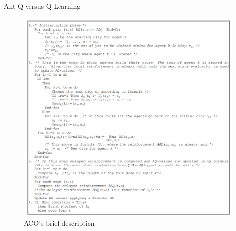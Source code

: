 \documentclass[aspectratio=169,xcolor=dvipsnames]{beamer}
\begin{document}
\begin{frame}{Ant-Q versus Q-Learning}
    
\end{frame}

\begin{frame}
   \begin{figure}
        \centering
        \includegraphics[scale = 0.40]{ACO pseudocode.png}
        \caption{ACO's brief description}
        \label{fig:my_label}
    \end{figure}
\end{frame}
\end{document}
